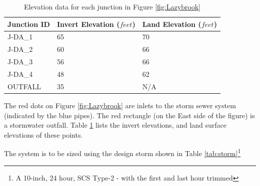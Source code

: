 \documentclass[12pt]{article}
\begin{document}
\begin{enumerate}
\begin{table}[ht!]
      \caption{Elevation data for each junction in Figure \ref{fig:Lazybrook} \\}
   \begin{tabular}{| p{1.6in} | p{1.6in} | p{1.6in} |} %
   \hline
   \hline
Junction ID & Invert Elevation ($feet$) & Land Elevation ($feet$) \\
\hline
\hline
J-DA\_1 &  65 & 70 \\
J-DA\_2 &  60 & 66 \\
J-DA\_3 &  56 & 66 \\
J-DA\_4 &  48 & 62 \\
OUTFALL &  35 & N/A \\
\hline
\hline
   \end{tabular}
   \label{tab:junctions}
\end{table}

\clearpage
The red dots on Figure \ref{fig:Lazybrook} are inlets to the storm sewer system (indicated by the blue pipes).  The red rectangle (on the East side of the figure) is a stormwater outfall.  Table \ref{tab:junctions} lists the invert elevations, and land surface elevations of these points. 

The system is to be sized using the design storm shown in Table \ref{tab:storm}\footnote{A 10-inch, 24 hour, SCS Type-2 - with the first and last hour trimmed}


\end{enumerate}
\end{document}
